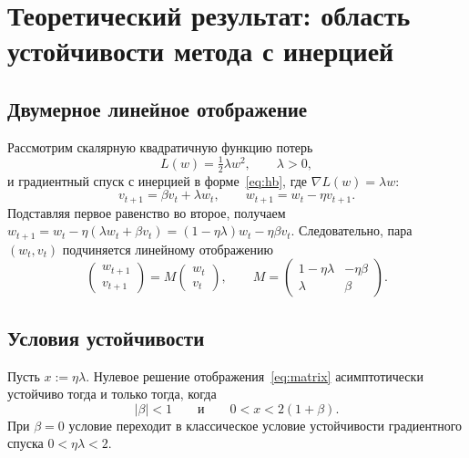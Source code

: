\section{Теоретический результат: область устойчивости метода с инерцией}\label{sec:theory}

\subsection{Двумерное линейное отображение}

Рассмотрим скалярную квадратичную функцию потерь
\begin{equation}
  L(w) = \tfrac12 \lambda w^2, \qquad \lambda > 0,
\end{equation}
и градиентный спуск с инерцией в форме~\eqref{eq:hb}, где $\nabla L(w) = \lambda w$:
\begin{equation}\label{eq:hb2}
  v_{t+1} = \beta v_t + \lambda w_t, \qquad w_{t+1} = w_t - \eta v_{t+1}.
\end{equation}
Подставляя первое равенство во второе, получаем
$w_{t+1} = w_t - \eta(\lambda w_t + \beta v_t) = (1-\eta\lambda)w_t - \eta\beta v_t$.
Следовательно, пара $(w_t,v_t)$ подчиняется линейному отображению
\begin{equation}\label{eq:matrix}
  \begin{pmatrix} w_{t+1} \\ v_{t+1}\end{pmatrix}
  = M \begin{pmatrix} w_t \\ v_t\end{pmatrix},
  \qquad
  M = \begin{pmatrix} 1-\eta\lambda & -\eta\beta \\[2pt] \lambda & \beta \end{pmatrix}.
\end{equation}

\subsection{Условия устойчивости}

\begin{proposition}\label{prop:stab}
Пусть $x := \eta\lambda$. Нулевое решение отображения~\eqref{eq:matrix}
асимптотически устойчиво тогда и только тогда, когда
\begin{equation}\label{eq:region}
  |\beta| < 1 \qquad\text{и}\qquad 0 < x < 2(1+\beta).
\end{equation}
При $\beta = 0$ условие переходит в классическое условие устойчивости
градиентного спуска $0 < \eta\lambda < 2$.
\end{proposition}

